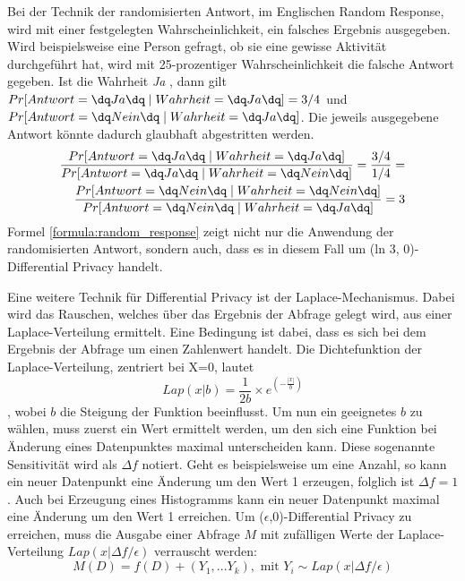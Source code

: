 Bei der Technik der randomisierten Antwort, im Englischen Random Response, wird mit einer festgelegten Wahrscheinlichkeit, ein falsches Ergebnis ausgegeben. 
Wird beispielsweise eine Person gefragt, ob sie eine gewisse Aktivität durchgeführt hat, wird mit 25-prozentiger Wahrscheinlichkeit die falsche Antwort gegeben.
Ist die Wahrheit \textit{\dq Ja \dq}, dann gilt $Pr[Antwort = \dq Ja\dq \mid Wahrheit = \dq Ja\dq] = 3/4$ und $Pr[Antwort = \dq Nein\dq \mid Wahrheit = \dq Ja\dq]$.
Die jeweils ausgegebene Antwort könnte dadurch glaubhaft abgestritten werden.
\begin{equation} \label{formula:random_response}
\begin{split}
\frac{Pr[Antwort = \dq Ja\dq \mid Wahrheit = \dq Ja\dq]}{Pr[Antwort = \dq Ja\dq \mid Wahrheit = \dq Nein\dq]} = \frac{3/4}{1/4} = \\
\frac{Pr[Antwort = \dq Nein\dq \mid Wahrheit = \dq Nein\dq]}{Pr[Antwort = \dq Nein\dq \mid Wahrheit = \dq Ja\dq]} =  3
\end{split}
\end{equation}
Formel \ref{formula:random_response} zeigt nicht nur die Anwendung der randomisierten Antwort, sondern auch, dass es in diesem Fall um (ln 3, 0)-Differential Privacy handelt.

Eine weitere Technik für Differential Privacy ist der Laplace-Mechanismus.
Dabei wird das Rauschen, welches über das Ergebnis der Abfrage gelegt wird, aus einer Laplace-Verteilung ermittelt.
Eine Bedingung ist dabei, dass es sich bei dem Ergebnis der Abfrage um einen Zahlenwert handelt.
Die Dichtefunktion der Laplace-Verteilung, zentriert bei X=0, lautet
\begin{equation}
    Lap(x|b) = \frac{1}{2b}\times e^{(-\frac{|x|}{b})}
\end{equation}
, wobei $b$ die Steigung der Funktion beeinflusst.
Um nun ein geeignetes $b$ zu wählen, muss zuerst ein Wert ermittelt werden, um den sich eine Funktion bei Änderung eines Datenpunktes maximal unterscheiden kann.
Diese sogenannte Sensitivität wird als $\Delta f$ notiert.
Geht es beispielsweise um eine Anzahl, so kann ein neuer Datenpunkt eine Änderung um den Wert 1 erzeugen, folglich ist $\Delta f = 1$.
Auch bei Erzeugung eines Histogramms kann ein neuer Datenpunkt maximal eine Änderung um den Wert 1 erreichen.
Um ($\epsilon$,0)-Differential Privacy zu erreichen, muss die Ausgabe einer Abfrage $M$ mit zufälligen Werte der Laplace-Verteilung $Lap(x | \Delta f/\epsilon)$ verrauscht werden: 
\begin{equation}
    M(D) = f(D) + (Y_1, ... Y_k),\text{ mit } Y_i \sim Lap(x| \Delta f/\epsilon)
\end{equation}


